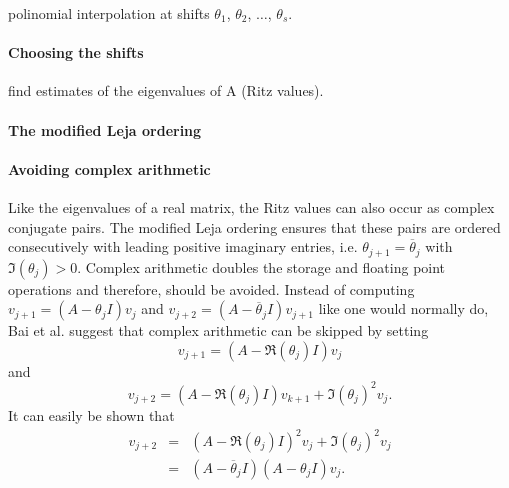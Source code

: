 \documentclass{scrartcl}
\numberwithin{equation}{section}
\begin{document}
polinomial interpolation at shifts $\theta_1$, $\theta_2$, $\ldots$, $\theta_s$.
\paragraph{Choosing the shifts}
find estimates of the eigenvalues of A (Ritz values).
\paragraph{The modified Leja ordering}

\paragraph{Avoiding complex arithmetic}
Like the eigenvalues of a real matrix, the Ritz values can also occur as complex conjugate pairs. The modified Leja ordering ensures that these pairs are ordered consecutively with leading positive imaginary entries, i.e. $\theta_{j + 1} = \overline{\theta}_j$ with $\Im(\theta_j) > 0$. Complex arithmetic doubles the storage and floating point operations and therefore, should be avoided. Instead of computing $v_{j + 1} = (A - \theta_j I)v_j$ and $v_{j + 2} = (A - \overline{\theta}_j I)v_{j + 1}$ like one would normally do, Bai et al. \cite{doi:10.1093/imanum/NewtonGMRES_bai} suggest that complex arithmetic can be skipped by setting
\begin{equation}
v_{j + 1} = (A - \Re(\theta_j) I )v_j
\end{equation}
and
\begin{equation}
v_{j + 2} = (A - \Re(\theta_j) I )v_{k + 1} + \Im(\theta_j)^2 v_j.
\end{equation}
It can easily be shown that 
\begin{eqnarray*}
v_{j + 2} &=& (A - \Re(\theta_j) I )^2v_{j} + \Im(\theta_j)^2 v_j \\
&=& (A - \overline{\theta}_j I )(A - \theta_j I )v_{j}.
\end{eqnarray*}
\end{document}
